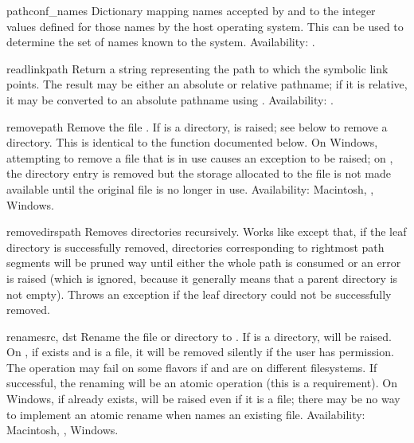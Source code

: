 \begin{datadesc}{pathconf_names}
Dictionary mapping names accepted by  and
 to the integer values defined for those names
by the host operating system.  This can be used to determine the set
of names known to the system.
Availability: \UNIX.
\end{datadesc}

\begin{funcdesc}{readlink}{path}
Return a string representing the path to which the symbolic link
points.  The result may be either an absolute or relative pathname; if
it is relative, it may be converted to an absolute pathname using
.
Availability: \UNIX.
\end{funcdesc}

\begin{funcdesc}{remove}{path}
Remove the file .  If  is a directory,
 is raised; see  below to remove
a directory.  This is identical to the  function
documented below.  On Windows, attempting to remove a file that is in
use causes an exception to be raised; on \UNIX, the directory entry is
removed but the storage allocated to the file is not made available
until the original file is no longer in use.
Availability: Macintosh, \UNIX, Windows.
\end{funcdesc}

\begin{funcdesc}{removedirs}{path}
Removes directories recursively.  Works like
 except that, if the leaf directory is
successfully removed, directories corresponding to rightmost path
segments will be pruned way until either the whole path is consumed or
an error is raised (which is ignored, because it generally means that
a parent directory is not empty).  Throws an 
exception if the leaf directory could not be successfully removed.
\end{funcdesc}

\begin{funcdesc}{rename}{src, dst}
Rename the file or directory  to .  If  is
a directory,  will be raised.  On \UNIX, if
 exists and is a file, it will be removed silently if the
user has permission.  The operation may fail on some \UNIX{} flavors
if  and  are on different filesystems.  If
successful, the renaming will be an atomic operation (this is a
\POSIX{} requirement).  On Windows, if  already exists,
 will be raised even if it is a file; there may be
no way to implement an atomic rename when  names an existing
file.
Availability: Macintosh, \UNIX, Windows.
\end{funcdesc}

